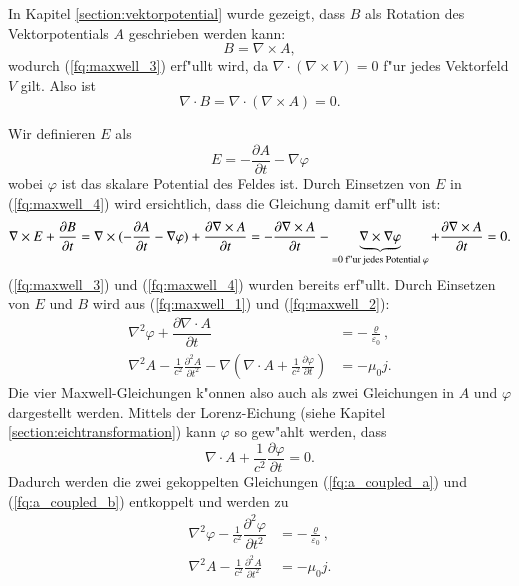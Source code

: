 \begin{refsection}
In Kapitel \ref{section:vektorpotential} wurde gezeigt, dass $B$ als Rotation des Vektorpotentials $A$ geschrieben werden kann:
\begin{equation}
B = \nabla\times A,
\end{equation}
wodurch (\ref{fq:maxwell_3}) erf"ullt wird, da $\nabla \cdot ( \nabla\times V ) = 0$ f"ur jedes Vektorfeld $V$ gilt. Also ist
\begin{equation*}
\nabla \cdot B = \nabla \cdot ( \nabla\times A ) = 0.
\end{equation*}

Wir definieren $E$ als
\begin{equation}
E = -\dfrac{\partial A}{\partial t} - \nabla \varphi
\end{equation}
wobei $\varphi$ ist das skalare Potential des Feldes ist. Durch Einsetzen von $E$ in (\ref{fq:maxwell_4}) wird ersichtlich, dass die Gleichung damit erf"ullt ist:
\begin{equation*}
\nabla\times E + \frac{\partial B }{\partial t} = \nabla\times (-\dfrac{\partial A}{\partial t} - \nabla \varphi) + \frac{\partial \nabla\times A }{\partial t} = 
- \frac{\partial \nabla\times A }{\partial t} - \underbrace{\nabla\times \nabla \varphi}_{=0\text{ f"ur jedes Potential } \varphi} + \frac{\partial \nabla\times A }{\partial t} = 0.\\
\end{equation*}
(\ref{fq:maxwell_3}) und (\ref{fq:maxwell_4}) wurden bereits erf"ullt. Durch Einsetzen von $E$ und $B$ wird aus (\ref{fq:maxwell_1}) und (\ref{fq:maxwell_2}):
\begin{align} 
 \label{fq:a_coupled_a}
 \nabla^2 \varphi + \dfrac{\partial \nabla \cdot A}{\partial t} &= -\frac{\varrho}{\varepsilon_0}, \\
 \label{fq:a_coupled_b}
 \nabla^2 A - \frac{1}{c^2} \frac{\partial^2 A }{\partial t^2} - \nabla \left( \nabla \cdot A + \frac{1}{c^2} \frac{\partial \varphi }{\partial t} \right) &= - \mu_0 j.
\end{align}
Die vier Maxwell-Gleichungen k"onnen also auch als zwei Gleichungen in $A$ und $\varphi$ dargestellt werden.
Mittels der Lorenz-Eichung (siehe Kapitel \ref{section:eichtransformation}) kann $\varphi$ so gew"ahlt werden, dass
\begin{equation} \label{fq:lorenz_eq}
\nabla \cdot A + \frac{1}{c^2} \frac{\partial \varphi }{\partial t} = 0.
\end{equation}
Dadurch werden die zwei gekoppelten Gleichungen (\ref{fq:a_coupled_a}) und (\ref{fq:a_coupled_b}) entkoppelt und werden zu
\begin{align*}
\nabla^2 \varphi - \frac{1}{c^2} \dfrac{\partial^2 \varphi}{\partial t^2} &= -\frac{\varrho}{\varepsilon_0}, \\
\nabla^2 A - \frac{1}{c^2} \frac{\partial^2 A }{\partial t^2} &= - \mu_0 j.
\end{align*}


\end{refsection}
